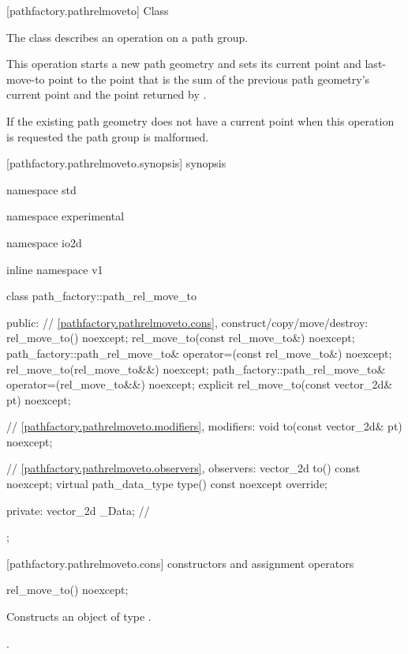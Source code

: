  [pathfactory.pathrelmoveto] {Class }

\pnum
{}
The class  describes an operation on a path group.

\pnum
This operation starts a new path geometry and sets its current point and last-move-to point to the point that is the sum of the previous path geometry's current point and the point returned by .

\pnum
If the existing path geometry does not have a current point when this operation is requested the path group is malformed.

 [pathfactory.pathrelmoveto.synopsis] { synopsis}

\begin{codeblock}
namespace std { namespace experimental { namespace io2d { inline namespace v1 {
  class path_factory::path_rel_move_to {
  public:
    // \ref{pathfactory.pathrelmoveto.cons}, construct/copy/move/destroy:
    rel_move_to() noexcept;
    rel_move_to(const rel_move_to&) noexcept;
    path_factory::path_rel_move_to& operator=(const rel_move_to&) noexcept;
    rel_move_to(rel_move_to&&) noexcept;
    path_factory::path_rel_move_to& operator=(rel_move_to&&) noexcept;
    explicit rel_move_to(const vector_2d& pt) noexcept;

    // \ref{pathfactory.pathrelmoveto.modifiers}, modifiers:
    void to(const vector_2d& pt) noexcept;

    // \ref{pathfactory.pathrelmoveto.observers}, observers:
    vector_2d to() const noexcept;
    virtual path_data_type type() const noexcept override;
    
  private:
    vector_2d _Data; // \expos
  };
} } } }
\end{codeblock}

 [pathfactory.pathrelmoveto.cons] { constructors and assignment operators}

\begin{itemdecl}
    rel_move_to() noexcept;
\end{itemdecl}
\begin{itemdescr}
	\pnum
	\effects
	Constructs an object of type .
	
	\pnum
	\postconditions
	.
\end{itemdescr}

